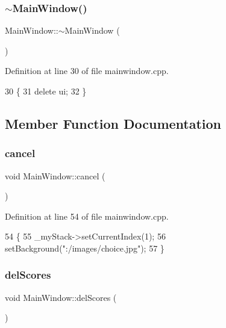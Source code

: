 \subsubsection{\texorpdfstring{$\sim$\+Main\+Window()}{~MainWindow()}}
{\footnotesize\ttfamily Main\+Window\+::$\sim$\+Main\+Window (\begin{DoxyParamCaption}{ }\end{DoxyParamCaption})}



Definition at line 30 of file mainwindow.\+cpp.


\begin{DoxyCode}
30                        \{
31     \textcolor{keyword}{delete} ui;
32 \}
\end{DoxyCode}


\subsection{Member Function Documentation}
\hypertarget{class_main_window_a04ae3dc178f46ea61ece2b9b209317b8}{}\label{class_main_window_a04ae3dc178f46ea61ece2b9b209317b8} 
\subsubsection{\texorpdfstring{cancel}{cancel}}
{\footnotesize\ttfamily void Main\+Window\+::cancel (\begin{DoxyParamCaption}{ }\end{DoxyParamCaption})\hspace{0.3cm}{\ttfamily [slot]}}



Definition at line 54 of file mainwindow.\+cpp.


\begin{DoxyCode}
54                        \{
55     \_myStack->setCurrentIndex(1);
56     setBackground(\textcolor{stringliteral}{":/images/choice.jpg"});
57 \}
\end{DoxyCode}
\hypertarget{class_main_window_aa760493201dbba331f4447e7b9d7b766}{}\label{class_main_window_aa760493201dbba331f4447e7b9d7b766} 
\subsubsection{\texorpdfstring{del\+Scores}{delScores}}
{\footnotesize\ttfamily void Main\+Window\+::del\+Scores (\begin{DoxyParamCaption}{ }\end{DoxyParamCaption})\hspace{0.3cm}{\ttfamily [slot]}}



